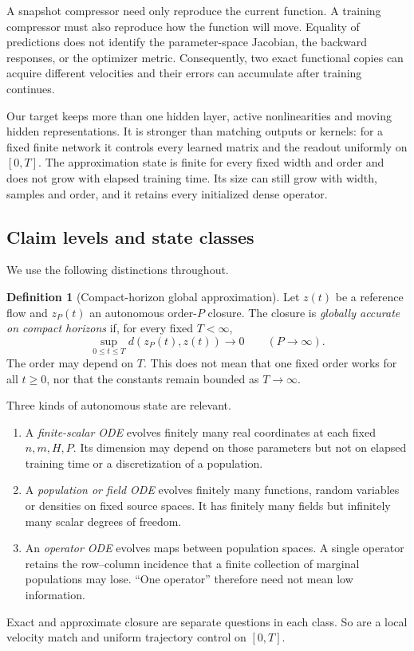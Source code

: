 \documentclass[11pt]{article}
\theoremstyle{definition}
\newtheorem{definition}[theorem]{Definition}
\theoremstyle{remark}
\begin{document}
A snapshot compressor need only reproduce the current function.  A training
compressor must also reproduce how the function will move.  Equality of
predictions does not identify the parameter-space Jacobian, the backward
responses, or the optimizer metric.  Consequently, two exact functional copies
can acquire different velocities and their errors can accumulate after training
continues.

Our target keeps more than one hidden layer, active nonlinearities and moving
hidden representations.  It is stronger than matching outputs or kernels: for a
fixed finite network it controls every learned matrix and the readout uniformly
on $[0,T]$.  The approximation state is finite for every fixed width and order
and does not grow with elapsed training time.  Its size can still grow with
width, samples and order, and it retains every initialized dense operator.

\subsection{Claim levels and state classes}

We use the following distinctions throughout.

\begin{definition}[Compact-horizon global approximation]
Let $z(t)$ be a reference flow and $z_P(t)$ an autonomous order-$P$ closure.
The closure is \emph{globally accurate on compact horizons} if, for every fixed
$T<\infty$,
\[
  \sup_{0\le t\le T} d(z_P(t),z(t))\longrightarrow0
  \qquad(P\to\infty).
\]
The order may depend on $T$.  This does not mean that one fixed order works for
all $t\ge0$, nor that the constants remain bounded as $T\to\infty$.
\end{definition}

Three kinds of autonomous state are relevant.
\begin{enumerate}
\item A \emph{finite-scalar ODE} evolves finitely many real coordinates at each
fixed $n,m,H,P$.  Its dimension may depend on those parameters but not on
elapsed training time or a discretization of a population.
\item A \emph{population or field ODE} evolves finitely many functions, random
variables or densities on fixed source spaces.  It has finitely many fields but
infinitely many scalar degrees of freedom.
\item An \emph{operator ODE} evolves maps between population spaces.  A single
operator retains the row--column incidence that a finite collection of marginal
populations may lose.  ``One operator'' therefore need not mean low information.
\end{enumerate}
Exact and approximate closure are separate questions in each class.  So are a
local velocity match and uniform trajectory control on $[0,T]$.
\end{document}
